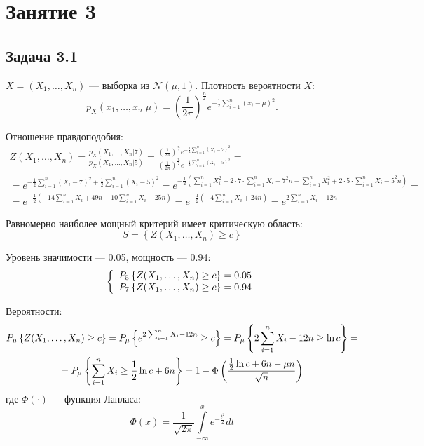 \chapter{Занятие 3}

\section*{Задача 3.1}
$X = (X_1, \dots, X_n)$ --- выборка из $\mathcal{N} (\mu, 1)$. Плотность вероятности $X$:
\begin{equation}
    p_X(x_1, \dots, x_n | \mu) = \left ( \frac{1}{2 \pi} \right )^{\frac{n}{2}} e^{-\frac{1}{2} \sum_{i=1}^n (x_i - \mu)^2} .
\end{equation}

Отношение правдоподобия:
\begin{multline}
    Z ( X_1, \dots, X_n )
    = \frac{p_X(X_1, \dots, X_n | 7)}{p_X(X_1, \dots, X_n | 5)}
    = \frac{\left ( \frac{1}{2 \pi} \right )^{\frac{n}{2}} e^{-\frac{1}{2} \sum_{i=1}^n (X_i - 7)^2}}{\left ( \frac{1}{2 \pi} \right )^{\frac{n}{2}} e^{-\frac{1}{2} \sum_{i=1}^n (X_i - 5)^2}} = \\
    = e^{-\frac{1}{2} \sum_{i=1}^n (X_i - 7)^2 + \frac{1}{2} \sum_{i=1}^n (X_i - 5)^2}
    = e^{-\frac{1}{2} \left ( \sum_{i=1}^n X_i^2 - 2 \cdot 7 \cdot \sum_{i=1}^n X_i + 7^2 n - \sum_{i=1}^n X_i^2 + 2 \cdot 5 \cdot \sum_{i=1}^n X_i - 5^2 n \right )} = \\
    = e^{-\frac{1}{2} \left ( - 14 \sum_{i=1}^n X_i + 49 n + 10 \sum_{i=1}^n X_i - 25 n \right )}
    = e^{-\frac{1}{2} \left ( - 4 \sum_{i=1}^n X_i + 24 n \right )}
    = e^{ 2 \sum_{i=1}^n X_i - 12n}
\end{multline}

Равномерно наиболее мощный критерий имеет критическую область:
\begin{equation}
    S = \left \{ Z(X_1, \dots, X_n) \ge c \right \}
\end{equation}

Уровень значимости --- 0.05, мощность --- 0.94:
\begin{equation}
    \left \{
    \begin{array}{c}
        P_5 \left \{ Z(X_1, \dots, X_n) \ge c \right \} = 0.05 \\
        P_7 \left \{ Z(X_1, \dots, X_n) \ge c \right \} = 0.94
    \end{array}
    \right .
\end{equation}

Вероятности:
\begin{multline}
    P_\mu \left \{ Z(X_1, \dots, X_n) \ge c \right \}
    = P_\mu \left \{ e^{ 2 \sum_{i=1}^n X_i - 12n} \ge c \right \}
    = P_\mu \left \{ 2 \sum_{i=1}^n X_i - 12n \ge \ln c \right \} = \\
    = P_\mu \left \{ \sum_{i=1}^n X_i \ge \frac{1}{2} \ln c + 6 n \right \}
    = 1 - \Phi \left ( \frac{\frac{1}{2} \ln c + 6 n - \mu n}{\sqrt{n}} \right )
\end{multline}
где $\Phi(\cdot)$ --- функция Лапласа:
\begin{equation}
    \Phi(x) = \frac{1}{\sqrt{2 \pi}} \int \limits_{-\infty}^x e^{- \frac{t^2}{2}} dt
\end{equation}

